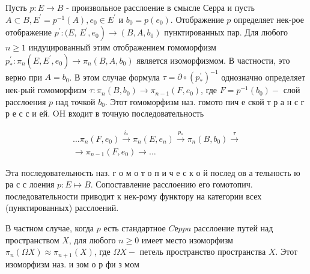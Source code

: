 \documentclass[10pt]{article}
\begin{document}
Пусть $p: E \rightarrow B$ - произвольное расслоение в смысле Серра и пусть $A \subset B, E^{\prime}=p^{-1}(A), e_{0} \in E^{\prime}$ и $b_{0}=p\left(e_{0}\right)$. Отображение $p$ определяет нек-рое отображение $p^{\prime}:(E$, $\left.E^{\prime}, e_{0}\right) \rightarrow\left(B, A, b_{0}\right)$ пунктированных пар. Для любого $n \geqslant 1$ индуцированный этим отображением гомоморфизм $p_{*}^{\prime}: \pi_{n}\left(E, E^{\prime}, e_{0}\right) \rightarrow \pi_{n}\left(B, A, b_{0}\right)$ является изоморфизмом. В частности, это верно при $A=b_{0}$. В этом случае формула $\tau=\partial \circ\left(p_{*}^{\prime}\right)^{-1}$ однозначно определяет нек-рый гомоморфизм $\tau: \pi_{n}\left(B, b_{0}\right) \rightarrow \pi_{n-1}\left(F, e_{0}\right)$, где $F=p^{-1}\left(b_{0}\right)-$ слой расслоения $p$ над точкой $b_{0}$. Этот гомоморфизм наз. гомото пич е ской т р а н с г р е с с и ей. $\mathrm{OH}$ входит в точную последовательность



\[

\begin{gathered}

\ldots \pi_{n}\left(F, e_{0}\right) \stackrel{i_{*}}{\longrightarrow} \pi_{n}\left(E, e_{n}\right) \stackrel{p_{*}}{\longrightarrow} \pi_{n}\left(B, b_{0}\right) \stackrel{\tau}{\longrightarrow} \\

\longrightarrow \pi_{n-1}\left(F, e_{0}\right) \longrightarrow \ldots

\end{gathered}

\]



Эта последовательность наз. г о м о т о п и ч е с к о й послед ов а тельность ю ра с с лоения $p: E \mapsto B$. Сопоставление расслоению его гомотопич. последовательности приводит к нек-рому функтору на категории всех (пунктированных) расслоений.



В частном случае, когда $p$ есть стандартное $C е p p a$ расслоение путей над пространством $X$, для любого $n \geqslant 0$ имеет место изоморфизм $\pi_{n}(\Omega X) \approx \pi_{n+1}(X)$, где $\Omega X-$ петель пространство пространства $X$. Этот изоморфизм наз. и зом о р фи з мом
\end{document}
